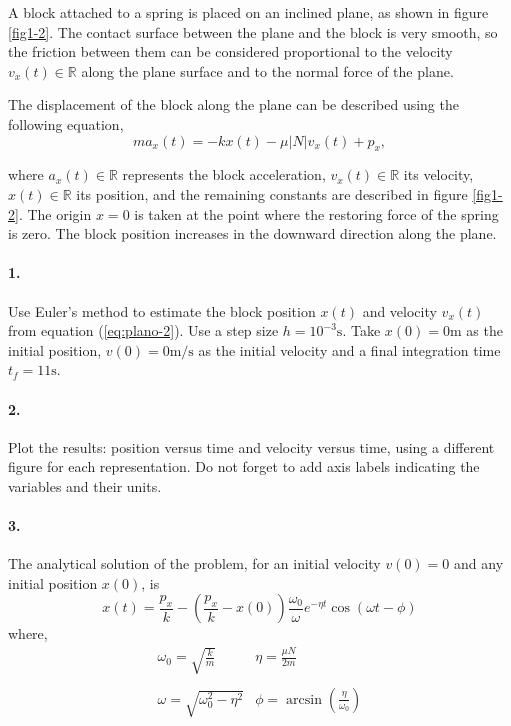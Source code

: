 A block attached to a spring is placed on an inclined plane, as shown in figure \ref{fig1-2}. The contact surface between the plane and the block is very smooth, so the friction between them can be considered proportional to the velocity $v_x(t)\in\mathbb{R}$ along the plane surface and to the normal force of the plane.

The displacement of the block along the plane can be described using the following equation,
\begin{equation}
	ma_{x}(t) = -kx(t) -\mu \lvert N \lvert v_x(t) + p_x, \label{eq:plano-2}
\end{equation}

where $a_x(t)\in\mathbb{R}$ represents the block acceleration, $v_x(t) \in\mathbb{R}$ its velocity, $x(t)\in\mathbb{R}$ its position, and the remaining constants are described in figure \ref{fig1-2}. The origin $x=0$ is taken at the point where the restoring force of the spring is zero. The block position increases in the downward direction along the plane.

\paragraph{1.} Use Euler's method to estimate the block position $x(t)$ and velocity $v_x(t)$ from equation (\ref{eq:plano-2}). Use a step size $h = 10^{-3}\text{s}$. Take $x(0) = 0\text{m}$ as the initial position, $v(0) = 0\text{m/s}$ as the initial velocity and a final integration time $t_{f}=11\text{s}$.

\paragraph{2.} Plot the results: position versus time and velocity versus time, using a different figure for each representation. Do not forget to add axis labels indicating the variables and their units.	 

\paragraph{3.} The analytical solution of the problem, for an initial velocity $v(0)=0$ and any initial position $x(0)$, is 
\begin{equation}\label{eq2-4}
	x(t) = \frac{p_x}{k}-\left(\frac{p_x}{k}-x(0)\right)\frac{\omega_0}{\omega}e^{-\eta t}\cos\left(\omega t-\phi \right)
\end{equation}
where,
\begin{equation}
\begin{matrix}
\omega_0 = \sqrt{\frac{k}{m}} & \eta = \frac{\mu N}{2m}\\
\ & \ \\
\omega = \sqrt{\omega_0^2 -\eta^2} &
\phi = \arcsin \left(\frac{\eta}{\omega_0}\right)
\end{matrix} \nonumber
\end{equation}


